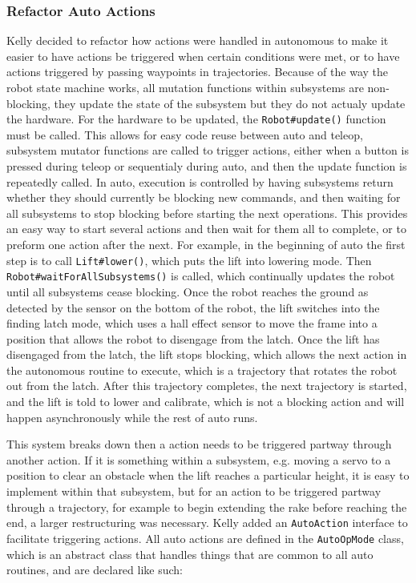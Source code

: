 \documentclass{article}
\begin{document}
\subsubsection{Refactor Auto Actions}
Kelly decided to refactor how actions were handled in autonomous to make it easier to have actions be triggered when certain conditions were met, or to have actions triggered by passing waypoints in trajectories. Because of the way the robot state machine works, all mutation functions within subsystems are non-blocking, they update the state of the subsystem but they do not actualy update the hardware. For the hardware to be updated, the \texttt{Robot\#update()} function must be called. This allows for easy code reuse between auto and teleop, subsystem mutator functions are called to trigger actions, either when a button is pressed during teleop or sequentialy during auto, and then the update function is repeatedly called. In auto, execution is controlled by having subsystems return whether they should currently be blocking new commands, and then waiting for all subsystems to stop blocking before starting the next operations. This provides an easy way to start several actions and then wait for them all to complete, or to preform one action after the next. For example, in the beginning of auto the first step is to call \texttt{Lift\#lower()}, which puts the lift into lowering mode. Then \texttt{Robot\#waitForAllSubsystems()} is called, which continually updates the robot until all subsystems cease blocking. Once the robot reaches the ground as detected by the sensor on the bottom of the robot, the lift switches into the finding latch mode, which uses a hall effect sensor to move the frame into a position that allows the robot to disengage from the latch. Once the lift has disengaged from the latch, the lift stops blocking, which allows the next action in the autonomous routine to execute, which is a trajectory that rotates the robot out from the latch. After this trajectory completes, the next trajectory is started, and the lift is told to lower and calibrate, which is not a blocking action and will happen asynchronously while the rest of auto runs. 

This system breaks down then a action needs to be triggered partway through another action. If it is something within a subsystem, e.g. moving a servo to a position to clear an obstacle when the lift reaches a particular height, it is easy to implement within that subsystem, but for an action to be triggered partway through a trajectory, for example to begin extending the rake before reaching the end, a larger restructuring was necessary. Kelly added an \texttt{AutoAction} interface to facilitate triggering actions. All auto actions are defined in the \texttt{AutoOpMode} class, which is an abstract class that handles things that are common to all auto routines, and are declared like such:
\end{document}
